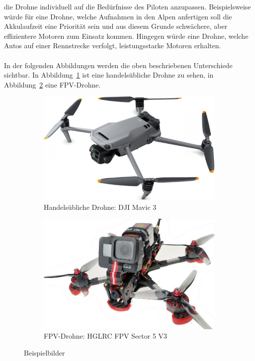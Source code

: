         die Drohne individuell auf die Bedürfnisse des Piloten anzupassen. Beispielsweise würde für eine Drohne,
        welche Aufnahmen in den Alpen anfertigen soll die Akkulaufzeit eine Priorität sein und aus diesem Grunde
        schwächere, aber effizientere Motoren zum Einsatz kommen. Hingegen würde eine Drohne, welche Autos
        auf einer Rennstrecke verfolgt, leistungsstarke Motoren erhalten. \\
        \\
        In der folgenden Abbildungen werden die oben beschriebenen Unterschiede sichtbar. In Abbildung~\ref*{HandelsueblicheDrohne}
        ist eine handelsübliche Drohne zu sehen, in Abbildung~\ref*{FpvDrohne} eine FPV-Drohne.

        \vspace{1.2cm}
        \begin{figure}[h]
            \centering
            \begin{subfigure}[b]{0.45\textwidth}
                \centering
                \includegraphics[width=\textwidth]{Img/Bild_DJIMavic3.jpg}
                \caption{Handelsübliche Drohne: DJI Mavic 3~\cite{BildMavic3}}
                \label{HandelsueblicheDrohne}
            \end{subfigure}
            \hfill
            \begin{subfigure}[b]{0.45\textwidth}
                \centering
                \includegraphics[width=\textwidth]{Img/Bild_FPV.jpg}
                \caption{FPV-Drohne: HGLRC FPV Sector 5 V3~\cite{BildFpv}}
                \label{FpvDrohne}
            \end{subfigure}
               \caption{Beispielbilder}
               \label{BeispielBilder}
       \end{figure}